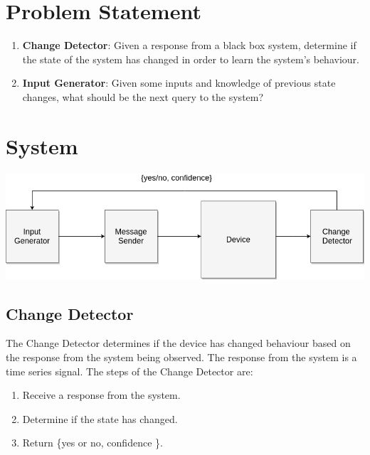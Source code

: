 \documentclass[11pt, a4paper]{article}
\begin{document}
\section*{Problem Statement} 

\begin{enumerate}
    \item \textbf{Change Detector}: Given a response from a black box system, determine if the state of the system has changed in order to learn the system's behaviour.
    \item \textbf{Input Generator}: Given some inputs and knowledge of previous state changes, what should be the next query to the system?
\end{enumerate}

\section*{System}

\includegraphics[scale=0.5]{change-detector.png}

\subsection*{Change Detector}
The Change Detector determines if the device has changed behaviour based on the response from the system being observed.
The response from the system is a time series signal.
The steps of the Change Detector are:
\begin{enumerate}
    \item Receive a response from the system.
    \item Determine if the state has changed.
    \item Return \{yes or no, confidence \}. 
\end{enumerate}
\end{document}
